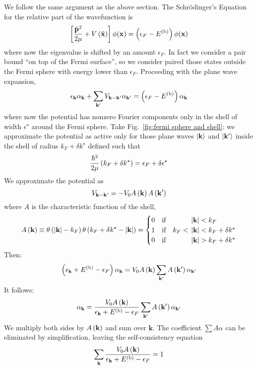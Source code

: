 We follow the same argument as the above section. 
The Schrödinger's Equation for the relative part of the wavefunction is
\[
	\left[{\frac{\hat{\mathbf{p}}^2}{2\mu} + V \left({\hat{\mathbf{x}}}\right)}\right] \phi(\mathbf{x}) = \left({\epsilon_F - E^{(\mathrm{b})}}\right) \phi(\mathbf{x})
\]
where now the eigenvalue is shifted by an amount $\epsilon_F$. In fact we consider a pair bound ``on top of the Fermi surface'', so we consider paired those states outside the Fermi sphere with energy lower than $\epsilon_F$. Proceeding with the plane wave expansion,
\[
	\epsilon_\mathbf{k} \alpha_\mathbf{k} + \sum_{\mathbf{k}'} V_{\mathbf{k}-\mathbf{k}'} \alpha_{\mathbf{k}'} = \left({\epsilon_F - E^{(\mathrm{b})}}\right) \alpha_\mathbf{k}
\]
where now the potential has nonzero Fourier components only in the shell of width $\epsilon^\star$ around the Fermi sphere. Take Fig.~\ref{fig:fermi sphere and shell}: we approximate the potential as active only for those plane waves $\ket{\mathbf{k}}$ and $\ket{\mathbf{k}'}$ inside the shell of radius $k_F + \delta k^\star$ defined such that
\[
	\frac{\hbar^2}{2\mu} \left({k_F + \delta k^\star}\right) = \epsilon_F + \delta \epsilon^\star
\]
We approximate the potential as
\[
	V_{\mathbf{k}-\mathbf{k}'} = - V_0 A\left({\mathbf{k}}\right) A\left({\mathbf{k}'}\right)
\]
where $A$ is the characteristic function of the shell,
\[
	A\left({\mathbf{k}}\right) \equiv \theta\left({\abs{\mathbf{k}}-k_F}\right)\theta\left({k_F+\delta k^\star -\abs{\mathbf{k}}}\right) = \begin{cases}
		0 \quad\text{if}\quad &\abs{\mathbf{k}}<k_F \\
		1 \quad\text{if}\quad  k_F<\hspace{-0.6em}&\abs{\mathbf{k}}<k_F+\delta k^\star \\
		0 \quad\text{if}\quad  &\abs{\mathbf{k}}>k_F+\delta k^\star \\
	\end{cases}
\]
Then:
\[
	\left({\epsilon_\mathbf{k} + E^{(\mathrm{b})} - \epsilon_F}\right) \alpha_\mathbf{k} = V_0 A\left({\mathbf{k}}\right) \sum_{\mathbf{k}'} A\left({\mathbf{k}'}\right) \alpha_{\mathbf{k}'}
\]
It follows:
\[
	\alpha_\mathbf{k} = \frac{V_0 A\left({\mathbf{k}}\right)}{\epsilon_\mathbf{k} + E^{(\mathrm{b})} - \epsilon_F} \sum_{\mathbf{k}'} A\left({\mathbf{k}'}\right) \alpha_{\mathbf{k}'}
\]
We multiply both sides by $A\left({\mathbf{k}}\right)$ and sum over $\mathbf{k}$. The coefficient $\sum A \alpha$ can be eliminated by simplification, leaving the self-consistency equation
\[
	\sum_\mathbf{k} \frac{V_0 A\left({\mathbf{k}}\right)}{\epsilon_\mathbf{k} + E^{(\mathrm{b})} - \epsilon_F} = 1
\]

